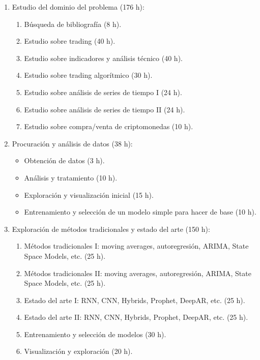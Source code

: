 \documentclass[
    11pt, %
]{charter}
\begin{document}
    \begin{enumerate}
    \item Estudio del dominio del problema (176 h):
      \begin{enumerate}
      \item Búsqueda de bibliografía (8 h).
      \item Estudio sobre trading (40 h).
      \item Estudio sobre indicadores y análisis técnico (40 h).
      \item Estudio sobre trading algorítmico (30 h).
      \item Estudio sobre análisis de series de tiempo I (24 h).
      \item Estudio sobre análisis de series de tiempo II (24 h).
      \item Estudio sobre compra/venta de criptomonedas (10 h).
      \end{enumerate}

    \item Procuración y análisis de datos (38 h):
      \begin{itemize}
      \item Obtención de datos (3 h).
      \item Análisis y tratamiento (10 h).
      \item Exploración y visualización inicial (15 h).
      \item Entrenamiento y selección de un modelo simple para hacer de base (10 h).
      \end{itemize}

    \item Exploración de métodos tradicionales y estado del arte (150 h):
      \begin{enumerate}
      \item Métodos tradicionales I: moving averages, autoregresión, ARIMA, State Space Models, etc. (25 h).
      \item Métodos tradicionales II: moving averages, autoregresión, ARIMA, State Space Models, etc. (25 h).
      \item Estado del arte I: RNN, CNN, Hybrids, Prophet, DeepAR, etc. (25 h).
      \item Estado del arte II: RNN, CNN, Hybrids, Prophet, DeepAR, etc. (25 h).
      \item Entrenamiento y selección de modelos (30 h).
      \item Visualización y exploración (20 h).
      \end{enumerate}


\end{enumerate}
\end{document}
